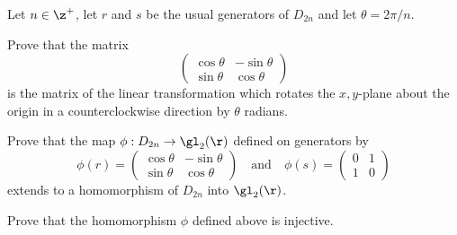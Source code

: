 \begin{exercise}\label{ex1.6.25}
    Let $n \in \z^+$, let $r$ and $s$ be the usual generators of $D_{2n}$ and let $\theta = 2\pi / n$.
    \begin{subproblems}
        \item Prove that the matrix 
        \[
        \begin{pmatrix}
        \cos \theta & -\sin \theta \\
        \sin \theta & \cos \theta
        \end{pmatrix}
        \]
        is the matrix of the linear transformation which rotates the $x,y$-plane about the origin in a counterclockwise direction by $\theta$ radians.
        \item Prove that the map $\phi : D_{2n} \to \gl_2(\r)$ defined on generators by
        \[
        \phi(r) = 
        \begin{pmatrix}
            \cos \theta & -\sin \theta \\
            \sin \theta & \cos \theta
        \end{pmatrix}
        \quad \text{and} \quad
        \phi(s) = 
        \begin{pmatrix}
            0 & 1 \\
            1 & 0
        \end{pmatrix}
        \]
        extends to a homomorphism of $D_{2n}$ into $\gl_2(\r)$.
        \item Prove that the homomorphism $\phi$ defined above is injective.
    \end{subproblems}
\end{exercise}

